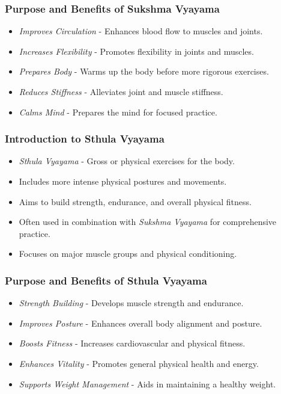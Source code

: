 \begin{frame}[fragile]\frametitle{Purpose and Benefits of Sukshma Vyayama}

      \begin{itemize}
		\item \textit{Improves Circulation} - Enhances blood flow to muscles and joints.
		\item \textit{Increases Flexibility} - Promotes flexibility in joints and muscles.
		\item \textit{Prepares Body} - Warms up the body before more rigorous exercises.
		\item \textit{Reduces Stiffness} - Alleviates joint and muscle stiffness.
		\item \textit{Calms Mind} - Prepares the mind for focused practice.
	  \end{itemize}

\end{frame}

\begin{frame}[fragile]\frametitle{Introduction to Sthula Vyayama}

      \begin{itemize}
		\item \textit{Sthula Vyayama} - Gross or physical exercises for the body.
		\item Includes more intense physical postures and movements.
		\item Aims to build strength, endurance, and overall physical fitness.
		\item Often used in combination with \textit{Sukshma Vyayama} for comprehensive practice.
		\item Focuses on major muscle groups and physical conditioning.
	  \end{itemize}

\end{frame}

\begin{frame}[fragile]\frametitle{Purpose and Benefits of Sthula Vyayama}

      \begin{itemize}
		\item \textit{Strength Building} - Develops muscle strength and endurance.
		\item \textit{Improves Posture} - Enhances overall body alignment and posture.
		\item \textit{Boosts Fitness} - Increases cardiovascular and physical fitness.
		\item \textit{Enhances Vitality} - Promotes general physical health and energy.
		\item \textit{Supports Weight Management} - Aids in maintaining a healthy weight.
	  \end{itemize}

\end{frame}

